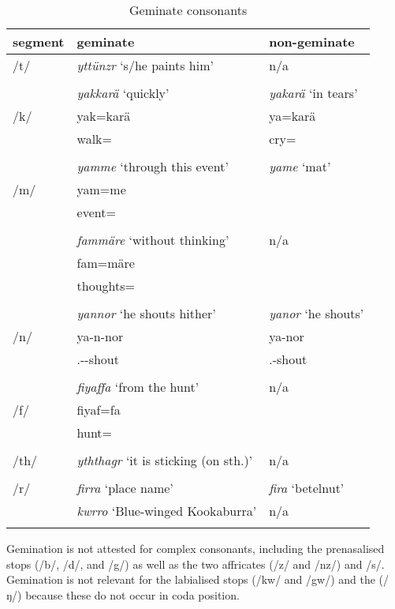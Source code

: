 \begin{table}
\caption{Geminate consonants}
\label{geminates}
	\begin{tabularx}{.8\textwidth}{lQl}
		\lsptoprule
		{segment} & {geminate} & {non-geminate} \\ \midrule
		/t/ & \emph{yttünzr} `s/he paints him' & n/a \\
		&&\\
		& \emph{yakkarä} `quickly' & \emph{yakarä} `in tears'\\
		/k/ & yak=karä & ya=karä \\
		& walk=\Prop{} & cry=\Prop{}\\
		&&\\
		& \emph{yamme} `through this event' & \emph{yame} `mat' \\
		/m/ & yam=me & \\
		& event=\Ins{} & \\
		&&\\
		& \emph{fammäre} `without thinking' & n/a \\
 	   	& fam=märe & \\
 	   	& thoughts=\Priv{} & \\
		&&\\
		& \emph{yannor} `he shouts hither' & \emph{yanor} `he shouts'\\
		/n/ & ya-n-nor & ya-nor \\
		& \Tsg{}.\Masc{}-\Venit{}-shout & \Tsg{}.\Masc{}-shout\\
		&&\\
 	   	& \emph{fiyaffa} `from the hunt' & n/a \\
		/f/ & fiyaf=fa & \\
		& hunt=\Abl{} & \\
		&&\\
		/th/ & \emph{yththagr} `it is sticking (on sth.)' 	& n/a \\
		&&\\
		/r/ & \emph{firra} `place name' & \emph{fira} `betelnut'\\
		& \emph{kwrro} `Blue-winged Kookaburra' & n/a \\
		\lspbottomrule
	\end{tabularx}
\end{table}%

Gemination is not attested for complex consonants, including the prenasalised stops (/b/, /d/, and /g/) as well as the two affricates (/z/ and /nz/) and /s/. Gemination is not relevant for the labialised  stops (/kw/ and /gw/) and the   (/ŋ/) because these do not occur in coda position.

